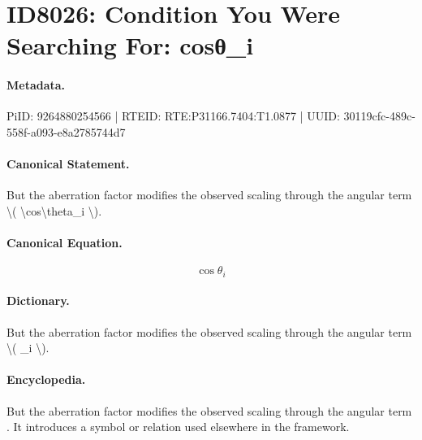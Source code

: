 \section*{ID8026: Condition You Were Searching For: cosθ\_i}
\paragraph{Metadata.}
PiID: 9264880254566 | RTEID: RTE:P31166.7404:T1.0877 | UUID: 30119cfc-489c-558f-a093-e8a2785744d7

\paragraph{Canonical Statement.}
But the aberration factor modifies the observed scaling through the angular term \textbackslash{}( \textbackslash{}cos\textbackslash{}theta\_i \textbackslash{}).

\paragraph{Canonical Equation.}
\[
\cos\theta_i
\]

\paragraph{Dictionary.}
But the aberration factor modifies the observed scaling through the angular term \textbackslash{}( \_i \textbackslash{}).

\paragraph{Encyclopedia.}
But the aberration factor modifies the observed scaling through the angular term . It introduces a symbol or relation used elsewhere in the framework.
